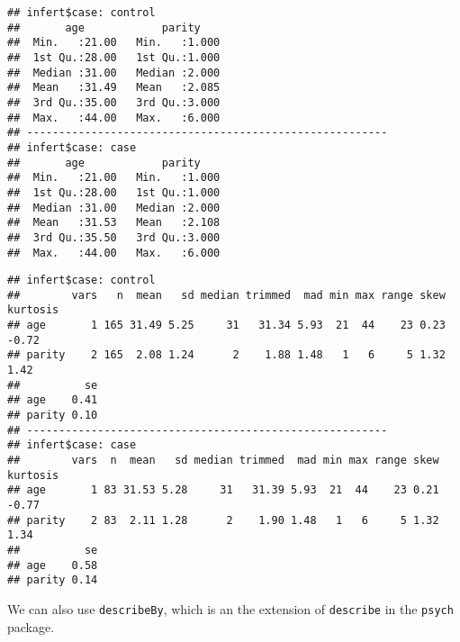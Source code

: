 \documentclass[]{book}
\newenvironment{Shaded}{\begin{snugshade}}{\end{snugshade}}
\newcommand{\KeywordTok}[1]{\textcolor[rgb]{0.13,0.29,0.53}{\textbf{{#1}}}}
\newcommand{\DataTypeTok}[1]{\textcolor[rgb]{0.13,0.29,0.53}{{#1}}}
\newcommand{\StringTok}[1]{\textcolor[rgb]{0.31,0.60,0.02}{{#1}}}
\newcommand{\NormalTok}[1]{{#1}}
\theoremstyle{definition}
\theoremstyle{definition}
\theoremstyle{remark}
\begin{document}
\begin{verbatim}
## infert$case: control
##       age            parity     
##  Min.   :21.00   Min.   :1.000  
##  1st Qu.:28.00   1st Qu.:1.000  
##  Median :31.00   Median :2.000  
##  Mean   :31.49   Mean   :2.085  
##  3rd Qu.:35.00   3rd Qu.:3.000  
##  Max.   :44.00   Max.   :6.000  
## -------------------------------------------------------- 
## infert$case: case
##       age            parity     
##  Min.   :21.00   Min.   :1.000  
##  1st Qu.:28.00   1st Qu.:1.000  
##  Median :31.00   Median :2.000  
##  Mean   :31.53   Mean   :2.108  
##  3rd Qu.:35.50   3rd Qu.:3.000  
##  Max.   :44.00   Max.   :6.000
\end{verbatim}

\begin{Shaded}
\end{Shaded}

\begin{verbatim}
## infert$case: control
##        vars   n  mean   sd median trimmed  mad min max range skew kurtosis
## age       1 165 31.49 5.25     31   31.34 5.93  21  44    23 0.23    -0.72
## parity    2 165  2.08 1.24      2    1.88 1.48   1   6     5 1.32     1.42
##          se
## age    0.41
## parity 0.10
## -------------------------------------------------------- 
## infert$case: case
##        vars  n  mean   sd median trimmed  mad min max range skew kurtosis
## age       1 83 31.53 5.28     31   31.39 5.93  21  44    23 0.21    -0.77
## parity    2 83  2.11 1.28      2    1.90 1.48   1   6     5 1.32     1.34
##          se
## age    0.58
## parity 0.14
\end{verbatim}

We can also use \texttt{describeBy}, which is an the extension of
\texttt{describe} in the \texttt{psych} package.

\begin{Shaded}
\end{Shaded}
\end{document}
